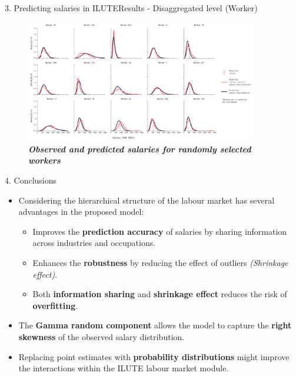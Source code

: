 \documentclass[aspectratio=169]{beamer}
\begin{document}
\begin{frame}{3. Predicting salaries in ILUTE}{Results - Disaggregated level (Worker)}
    \vspace*{-18pt}
    \begin{figure}
        \centering
        \includegraphics[width=0.90\textwidth]{./images/workers.png}
        \captionsetup{labelformat=empty}
        \setlength{\abovecaptionskip}{-2pt} %
        \caption{\fontsize{8pt}{8pt}\selectfont \textbf{\textit{Observed and predicted salaries for randomly selected workers}}}
    \end{figure}
\end{frame}


\begin{frame}{4. Conclusions}
    \begin{itemize}
        \setlength{\itemsep}{10pt} %
        \item \fontsize{9pt}{9pt}\selectfont Considering the hierarchical structure of the labour market has several advantages in the proposed model:
        \begin{itemize}
            \setlength{\itemsep}{10pt} %
            \item \fontsize{9pt}{9pt}\selectfont Improves the \textbf{prediction accuracy} of salaries by sharing information across industries and occupations.
            \item \fontsize{9pt}{9pt}\selectfont Enhances the \textbf{robustness} by reducing the effect of outliers \textit{(Shrinkage effect)}.
            \item \fontsize{9pt}{9pt}\selectfont Both \textbf{information sharing} and \textbf{shrinkage effect} reduces the risk of \textbf{overfitting}.
        \end{itemize}
        \item \fontsize{9pt}{9pt}\selectfont The \textbf{Gamma random component} allows the model to capture the \textbf{right skewness} of the observed salary distribution.
        \item \fontsize{9pt}{9pt}\selectfont Replacing point estimates with \textbf{probability distributions} might improve the interactions within the ILUTE labour market module.
    \end{itemize}
\end{frame}
\end{document}
